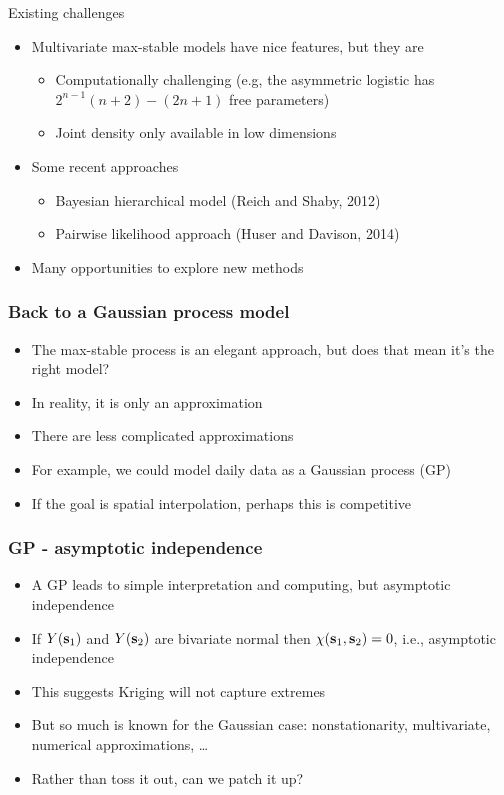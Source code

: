 \documentclass{beamer}
\begin{document}
 \begin{frame}{Existing challenges}
   \begin{itemize} \setlength{\itemsep}{1em}
     \item Multivariate max-stable models have nice features, but they are
     \begin{itemize}
       \item Computationally challenging (e.g,  the asymmetric logistic has $2^{n-1}(n + 2) - (2n + 1)$ free parameters)
       \item Joint density only available in low dimensions
     \end{itemize}
     \item Some recent approaches
     \begin{itemize}
       \item Bayesian hierarchical model (Reich and Shaby, 2012)
       \item Pairwise likelihood approach (Huser and Davison, 2014)
     \end{itemize}
     \item Many opportunities to explore new methods
   \end{itemize}
 \end{frame}


 \begin{frame}\frametitle{Back to a Gaussian process model}
 	\begin{itemize}\setlength\itemsep{\fill}
 	\item The max-stable process is an elegant approach, but does that mean it's the right model?
 	\item In reality, it is only an approximation
 	\item There are less complicated approximations
 	\item For example, we could model daily data as a Gaussian process (GP)
 	\item If the goal is spatial interpolation, perhaps this is competitive
 	\end{itemize}
 \end{frame}


 \begin{frame}\frametitle{GP - asymptotic independence}
 	\begin{itemize}\setlength\itemsep{\fill}
 	\item A GP leads to simple interpretation and computing, but asymptotic independence
 	\item If $Y(\mathbf{s}_1)$ and $Y(\mathbf{s}_2)$ are bivariate normal then $\chi(\mathbf{s}_1,\mathbf{s}_2)=0$, i.e., asymptotic independence
 	\item This suggests Kriging will not capture extremes
 	\item But so much is known for the Gaussian case: nonstationarity, multivariate, numerical approximations, \ldots
 	\item Rather than toss it out, can we patch it up?
 	\end{itemize}
 \end{frame}
\end{document}
